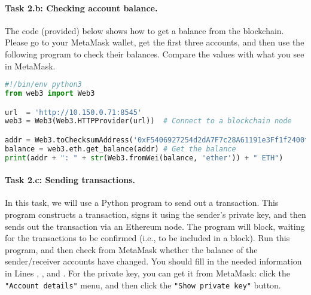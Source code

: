 \paragraph{Task 2.b: Checking account balance.} 
The code (provided) below shows how to get a balance from the blockchain.
Please go to your MetaMask wallet, get the first three accounts,
and then use the following program to check their balances.
Compare the values with what you see in MetaMask. 

\begin{lstlisting}[caption=Get balance (\texttt{web3\_balance.py}), language=python] 
#!/bin/env python3
from web3 import Web3

url  = 'http://10.150.0.71:8545'
web3 = Web3(Web3.HTTPProvider(url))  # Connect to a blockchain node

addr = Web3.toChecksumAddress('0xF5406927254d2dA7F7c28A61191e3Ff1f2400fe9')
balance = web3.eth.get_balance(addr) # Get the balance 
print(addr + ": " + str(Web3.fromWei(balance, 'ether')) + " ETH")
\end{lstlisting}
 

\paragraph{Task 2.c: Sending transactions.} 
In this task, we will use a Python program to send out a transaction. 
This program constructs a transaction, signs it using the sender's
private key, and then sends out the transaction via an Ethereum node.
The program will block, waiting for the transactions to be 
confirmed (i.e., to be included in a block). Run this program,
and then check from MetaMask whether the balance of the sender/receiver
accounts have changed. You should fill in the needed information
in Lines \lineone, \linetwo, and \linethree. For the private key,
you can get it from MetaMask: click the \texttt{"Account details"}
menu, and then click the \texttt{"Show private key"} button.


